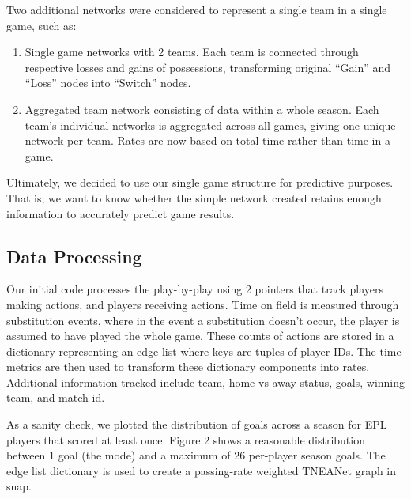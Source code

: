 Two additional networks were considered to represent a single team in a single game, such as:

\begin{enumerate}
    \item Single game networks with 2 teams. Each team is connected through respective losses and gains of possessions, transforming original ``Gain'' and ``Loss'' nodes into ``Switch'' nodes.

    \item Aggregated team network consisting of data within a whole season. Each team's individual networks is aggregated across all games, giving one unique network per team. Rates are now based on total time rather than time in a game. 
\end{enumerate}

Ultimately, we decided to use our single game structure for predictive purposes. That is, we want to know whether the simple network created retains enough information to accurately predict game results. 

\subsection{Data Processing}

Our initial code processes the play-by-play using 2 pointers that track players making actions, and players receiving actions. Time on field is measured through substitution events, where in the event a substitution doesn't occur, the player is assumed to have played the whole game. These counts of actions are stored in a dictionary representing an edge list where keys are tuples of player IDs. The time metrics are then used to transform these dictionary components into rates. Additional information tracked include team, home vs away status, goals, winning team, and match id. 

As a sanity check, we plotted the distribution of goals across a season for EPL players that scored at least once. Figure 2 shows a reasonable distribution between 1 goal (the mode) and a maximum of 26 per-player season goals. The edge list dictionary is used to create a passing-rate weighted TNEANet graph in snap. 




